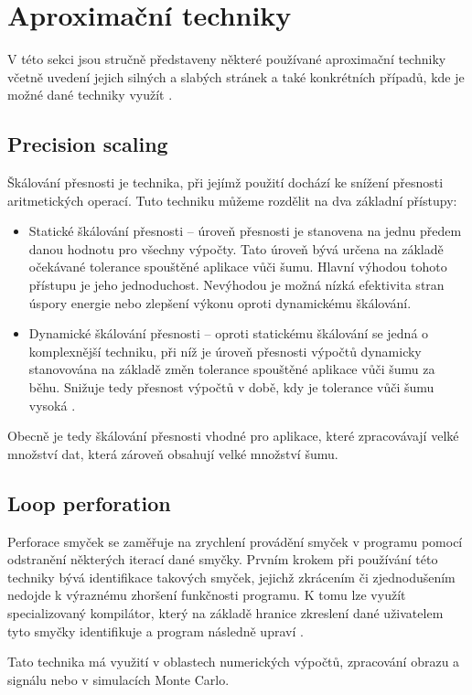 \section{Aproximační techniky}
V této sekci jsou stručně představeny některé používané aproximační techniky včetně uvedení jejich silných a slabých stránek a také konkrétních případů, kde je možné dané techniky využít \cite{ac_techniques}.

\subsection*{Precision scaling}
Škálování přesnosti je technika, při jejímž použití dochází ke snížení přesnosti aritmetických operací. Tuto techniku můžeme rozdělit na dva základní přístupy:
\begin{itemize}
    \item Statické škálování přesnosti -- úroveň přesnosti je stanovena na jednu předem danou hodnotu pro všechny výpočty. Tato úroveň bývá určena na základě očekávané tolerance spouštěné aplikace vůči šumu. Hlavní výhodou tohoto přístupu je jeho jednoduchost. Nevýhodou je možná nízká efektivita stran úspory energie nebo zlepšení výkonu oproti dynamickému škálování.
    \item Dynamické škálování přesnosti -- oproti statickému škálování se jedná o komplexnější techniku, při níž je úroveň přesnosti výpočtů dynamicky stanovována na základě změn tolerance spouštěné aplikace vůči šumu za běhu. Snižuje tedy přesnost výpočtů v době, kdy je tolerance vůči šumu vysoká \cite{precision_scaling}.
\end{itemize}

Obecně je tedy škálování přesnosti vhodné pro aplikace, které zpracovávají velké množství dat, která zároveň obsahují velké množství šumu.

\subsection*{Loop perforation}
Perforace smyček se zaměřuje na zrychlení provádění smyček v programu pomocí odstranění některých iterací dané smyčky. Prvním krokem při používání této techniky bývá identifikace takových smyček, jejichž zkrácením či zjednodušením nedojde k výraznému zhoršení funkčnosti programu. K tomu lze využít specializovaný kompilátor, který na základě hranice zkreslení dané uživatelem tyto smyčky identifikuje a program následně upraví \cite{code_perforation}.

Tato technika má využití v oblastech numerických výpočtů, zpracování obrazu a signálu nebo v simulacích Monte Carlo.

